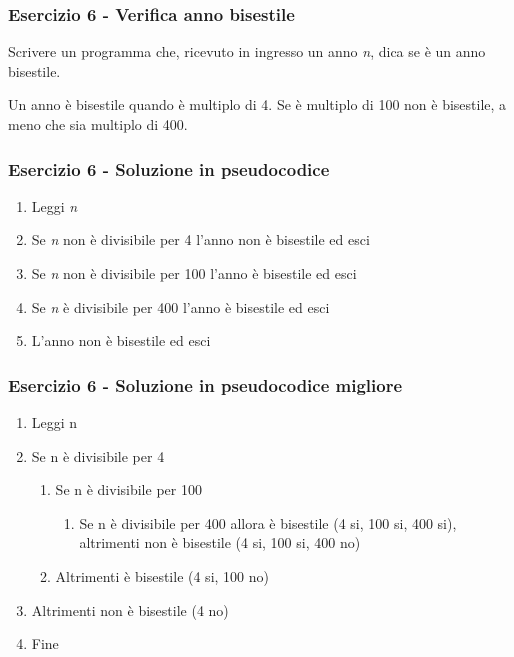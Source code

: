 \documentclass[handout]{beamer}
\begin{document}
\begin{frame}
\frametitle{Esercizio 6 - Verifica anno bisestile}
Scrivere un programma che, ricevuto in ingresso un anno \emph{n}, dica se è un anno bisestile.

Un anno è bisestile quando è multiplo di 4. Se è multiplo di 100 non è bisestile, a meno che sia multiplo di 400.
\end{frame}

\begin{frame}
\frametitle{Esercizio 6 - Soluzione in pseudocodice}
\begin{enumerate}
	\item Leggi \emph{n}
	\item Se \emph{n} non è divisibile per 4 l'anno \alert{non è} bisestile ed esci
	\item Se \emph{n} non è divisibile per 100 l'anno \alert{è} bisestile ed esci
	\item Se \emph{n} è divisibile per 400 l'anno \alert{è} bisestile ed esci
	\item L'anno \alert{non è} bisestile ed esci 
\end{enumerate}
\end{frame}

\begin{frame}
\frametitle{Esercizio 6 - Soluzione in pseudocodice migliore}
\begin{enumerate}
	\item Leggi n
	\item Se n è divisibile per 4
	\begin{enumerate}
		\item Se n è divisibile per 100
		\begin{enumerate}
			\item Se n è divisibile per 400 allora \alert{è} bisestile (4 si, 100 si, 400 si), altrimenti \alert{non è} bisestile (4 si, 100 si, 400 no)
		\end{enumerate}
		\item Altrimenti \alert{è} bisestile (4 si, 100 no)
	\end{enumerate}
	\item Altrimenti \alert{non è} bisestile (4 no)
	\item Fine
\end{enumerate}
\end{frame}
\end{document}
